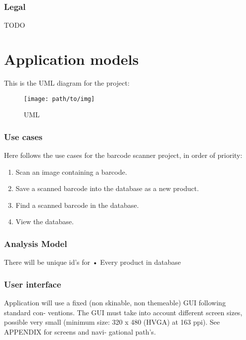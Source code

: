 \documentclass{report}
\begin{document}
\subsection{Legal}
TODO

\pagebreak

\chapter{Application models}
This is the UML diagram for the project:
\begin{figure}[H]
		\centering
		\texttt{[image: path/to/img]}
		\caption{UML}
		\label{fig:name_of_figure}
\end{figure}




\subsection{Use cases}
Here follows the use cases for the barcode scanner project, in order of priority: 

\begin{enumerate}
  \item Scan an image containing a barcode.
  \item Save a scanned barcode into the database as a new product.
  \item Find a scanned barcode in the database.
  \item View the database.
\end{enumerate}

\subsection{Analysis Model}

There will be unique id's for
• Every product in database

\subsection{User interface}
Application will use a fixed (non skinable, non themeable) GUI following standard con- ventions. The GUI must take into account different screen sizes, possible very small (minimum size: 320 x 480 (HVGA) at 163 ppi). See APPENDIX for screens and navi- gational path's.





\appendix
\end{document}
